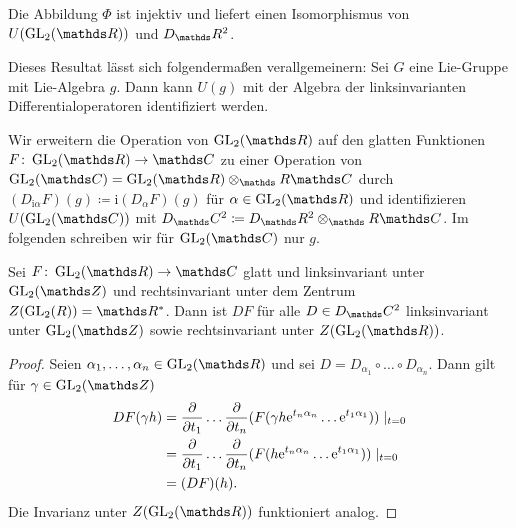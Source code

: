 \begin{thm}
Die Abbildung $\Phi$ ist injektiv und liefert einen Isomorphismus von $U(\GL_2(\R))$ und $D_\R^2$.
\end{thm}

Dieses Resultat lässt sich folgendermaßen verallgemeinern:
Sei $G$ eine Lie-Gruppe mit Lie-Algebra $g$.
Dann kann $U(g)$ mit der Algebra der linksinvarianten Differentialoperatoren identifiziert werden.

Wir erweitern die Operation von $\GL_2(\R)$ auf den glatten Funktionen
$F \colon \GL_2(\R) \to \C$ zu einer Operation von $\GL_2(\C)=\GL_2(\R) \otimes_\R \C$ durch $(D_{\mathrm{i}\alpha} F)(g)\coloneqq \mathrm{i} (D_\alpha F)(g)$
für $\alpha \in \GL_2(\R)$ und identifizieren $U(\GL_2(\C))$ mit $D_\C^2 \coloneqq D_\R^2 \otimes_\R \C$.
Im folgenden schreiben wir für $\GL_2(\C)$ nur $g$.

\begin{prop}
Sei $F \colon \GL_2(\R) \to \C$ glatt und linksinvariant unter $\GL_2(\Z)$
und rechtsinvariant unter dem Zentrum $Z(\GL_2(R))=\R^\ast$.
Dann ist $DF$ für alle $D \in D_\C^2$ linksinvariant unter $\GL_2(\Z)$ sowie rechtsinvariant unter $Z(\GL_2(\R))$.
\end{prop}
\begin{proof}
Seien $\alpha_1,\dots,\alpha_n \in \GL_2(\R)$ und sei $D=D_{\alpha_1} \circ \dots \circ D_{\alpha_n}$.
Dann gilt für $\gamma \in \GL_2(\Z)$
\begin{align*}
DF(\gamma h) &=\frac{\partial}{\partial t_1}\dots \frac{\partial}{\partial t_n}(F(\gamma h \mathrm{e}^{t_n\alpha_n} \dots \mathrm{e}^{t_1\alpha_1}))\mid_{t=0}\\
&=\frac{\partial}{\partial t_1}\dots \frac{\partial}{\partial t_n}(F( h \mathrm{e}^{t_n\alpha_n} \dots \mathrm{e}^{t_1\alpha_1}))\mid_{t=0}\\
&=(DF)(h).
\end{align*}
Die Invarianz unter $Z(\GL_2(\R))$ funktioniert analog.
\end{proof}
